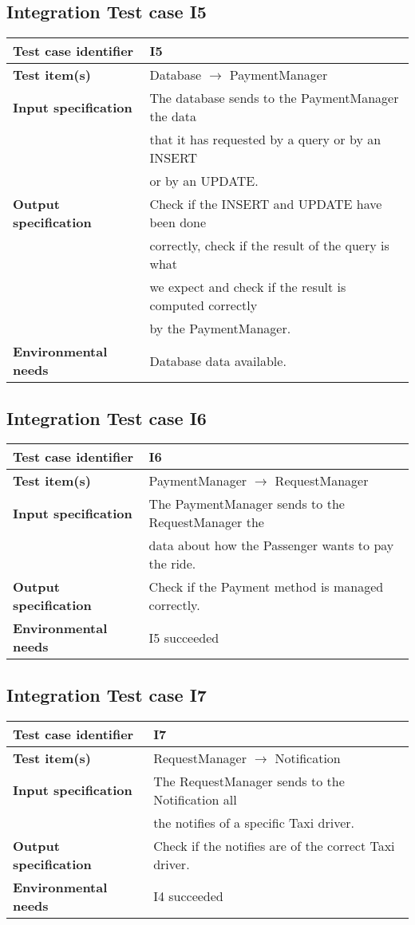 \documentclass[18pt,oneside,a4paper, titlepage]{article}
\begin{document}
	\subsection{Integration Test case I5}
		\begin{tabular}{ l l}
			\hline 		\textbf{Test case identifier} & I5 \\
			\hline		\textbf{Test item(s)}  & Database $\rightarrow$ PaymentManager \\
			\hline		\textbf{Input specification} & The database sends to the PaymentManager the data\\ & that it has requested by a query or by an INSERT \\ & or by an UPDATE.\\
			\hline		\textbf{Output specification} &  Check if the INSERT and UPDATE have been done\\ & correctly, check if the result of the query is what\\ &  we expect and check if the result is computed correctly\\ & by the PaymentManager.\\
			\hline		\textbf{Environmental needs} & Database data available.\\
			\hline
		\end{tabular}
	\subsection{Integration Test case I6}
		\begin{tabular}{ l l}
			\hline 		\textbf{Test case identifier} & I6 \\
			\hline		\textbf{Test item(s)}  & PaymentManager $\rightarrow$ RequestManager \\
			\hline		\textbf{Input specification} & The PaymentManager sends to the RequestManager the \\ & data about how the Passenger wants to pay the ride.\\
			\hline		\textbf{Output specification} & Check if the Payment method is managed correctly.\\
			\hline		\textbf{Environmental needs} & I5 succeeded\\
			\hline
		\end{tabular}
	\subsection{Integration Test case I7}
		\begin{tabular}{ l l}
			\hline 		\textbf{Test case identifier} & I7 \\
			\hline		\textbf{Test item(s)}  & RequestManager $\rightarrow$ Notification \\
			\hline		\textbf{Input specification} & The RequestManager sends to the Notification all \\ & the notifies of a specific Taxi driver.\\
			\hline		\textbf{Output specification} & Check if the notifies are of the correct Taxi driver.\\
			\hline		\textbf{Environmental needs} & I4 succeeded\\
			\hline
		\end{tabular}
\end{document}
